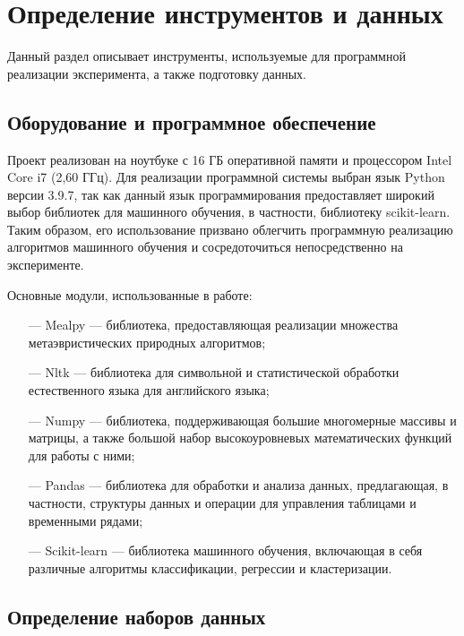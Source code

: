 \section{Определение инструментов и данных}

Данный раздел описывает инструменты, используемые для программной реализации эксперимента, а
также подготовку данных.

\subsection{Оборудование и программное обеспечение}

Проект реализован на ноутбуке с 16 ГБ оперативной памяти и процессором Intel Core i7 (2,60 ГГц).
Для реализации программной системы выбран язык Python версии 3.9.7, так как данный язык 
программирования предоставляет широкий выбор библиотек для машинного обучения, в частности,
библиотеку scikit-learn. Таким образом, его использование призвано облегчить программную
реализацию алгоритмов машинного обучения и сосредоточиться непосредственно на
эксперименте.


Основные модули, использованные в работе:

\begin{itemize}
    \item[—] Mealpy — библиотека, предоставляющая реализации множества метаэвристических природных алгоритмов;
    \item[—] Nltk — библиотека для символьной и статистической обработки естественного языка для английского языка;
    \item[—] Numpy — библиотека, поддерживающая большие многомерные массивы и матрицы, а также большой набор высокоуровневых математических функций для работы с ними;
    \item[—] Pandas — библиотека для обработки и анализа данных, предлагающая, в частности, структуры данных и операции для управления таблицами и временными рядами;
    \item[—] Scikit-learn — библиотека машинного обучения, включающая в себя различные алгоритмы классификации,
        регрессии и кластеризации.
\end{itemize}

\subsection{Определение наборов данных}\label{datasets}

